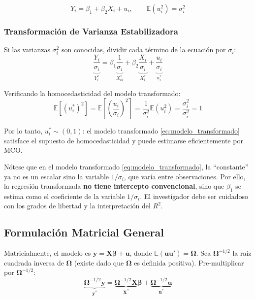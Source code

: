 \documentclass[12pt,a4paper]{report}
\theoremstyle{definition}
\theoremstyle{remark}
\newcommand{\E}{\mathbb{E}}
\begin{document}
\begin{equation}
  Y_i = \beta_1 + \beta_2 X_i + u_i, \qquad \E(u_i^2) = \sigma_i^2
  \label{eq:modelo_original}
\end{equation}

\subsubsection{Transformación de Varianza Estabilizadora}

Si las varianzas $\sigma_i^2$ son conocidas, dividir cada término de la ecuación por $\sigma_i$:
\begin{equation}
  \underbrace{\frac{Y_i}{\sigma_i}}_{Y_i^*} = \beta_1 \underbrace{\frac{1}{\sigma_i}}_{X_{0i}^*} + \beta_2 \underbrace{\frac{X_i}{\sigma_i}}_{X_i^*} + \underbrace{\frac{u_i}{\sigma_i}}_{u_i^*}
  \label{eq:modelo_transformado}
\end{equation}

Verificando la homocedasticidad del modelo transformado:
\begin{equation}
  \E\left[(u_i^*)^2\right] = \E\left[\left(\frac{u_i}{\sigma_i}\right)^2\right] = \frac{1}{\sigma_i^2}\E(u_i^2) = \frac{\sigma_i^2}{\sigma_i^2} = 1
  \label{eq:verif_homo}
\end{equation}

Por lo tanto, $u_i^* \sim (0, 1)$: el modelo transformado \eqref{eq:modelo_transformado} satisface el supuesto de homocedasticidad y puede estimarse eficientemente por MCO.

\begin{tcolorbox}[notastyle, title={Nota Importante: Pérdida del Intercepto}]
  Nótese que en el modelo transformado \eqref{eq:modelo_transformado}, la ``constante'' ya no es un escalar sino la variable $1/\sigma_i$, que varía entre observaciones. Por ello, la regresión transformada \textbf{no tiene intercepto convencional}, sino que $\beta_1$ se estima como el coeficiente de la variable $1/\sigma_i$. El investigador debe ser cuidadoso con los grados de libertad y la interpretación del $R^2$.
\end{tcolorbox}

\subsection{Formulación Matricial General}

Matricialmente, el modelo es $\mathbf{y} = \mathbf{X}\boldsymbol{\beta} + \mathbf{u}$, donde $\E(\mathbf{u}\mathbf{u}') = \boldsymbol{\Omega}$. Sea $\boldsymbol{\Omega}^{-1/2}$ la raíz cuadrada inversa de $\boldsymbol{\Omega}$ (existe dado que $\boldsymbol{\Omega}$ es definida positiva). Pre-multiplicar por $\boldsymbol{\Omega}^{-1/2}$:
\begin{equation}
  \underbrace{\boldsymbol{\Omega}^{-1/2}\mathbf{y}}_{\mathbf{y}^*} = \underbrace{\boldsymbol{\Omega}^{-1/2}\mathbf{X}}_{\mathbf{X}^*}\boldsymbol{\beta} + \underbrace{\boldsymbol{\Omega}^{-1/2}\mathbf{u}}_{\mathbf{u}^*}
  \label{eq:modelo_matricial_trans}
\end{equation}
\end{document}
